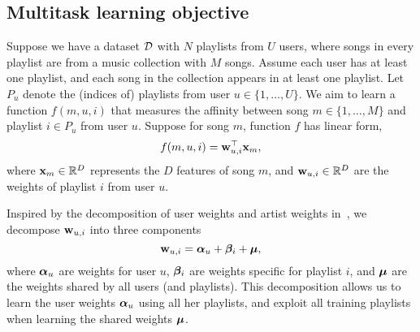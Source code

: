 \subsection{Multitask learning objective}

Suppose we have
a dataset $\mathcal{D}$ with $N$ playlists from $U$ users, 
where songs in every playlist are from a music collection with $M$ songs.
Assume each user has at least one playlist, and each song in the collection 
appears in at least one playlist.
%
Let $P_u$ denote the (indices of) playlists from user $u \in \{1,\dots,U\}$.
We aim to learn a function $f(m, u, i)$ that measures the affinity between 
song $m \in \{1,\dots,M\}$ and playlist $i \in P_u$ from user $u$.
Suppose for song $m$, function $f$ has linear form,
\begin{equation}
\label{eq:scorefunc}
f(m, u, i) = \mathbf{w}_{u,i}^\top \mathbf{x}_m,
\end{equation}
where %
$\mathbf{x}_m \in \mathbb{R}^D$ represents the $D$ features of song $m$,
and $\mathbf{w}_{u,i} \in \mathbb{R}^D$ are the weights %
of playlist $i$ from user $u$.



Inspired by the decomposition of user weights and artist weights in~\cite{ben2017groove},
we decompose $\mathbf{w}_{u,i}$ %
into three components
\begin{equation}
\label{eq:decomp}
\mathbf{w}_{u, i} = {\bm{\alpha}}_u + {\bm{\beta}}_i + \bm{\mu},
\end{equation}
where ${\bm{\alpha}}_u$ are weights for user $u$,
${\bm{\beta}}_i$ are weights specific for playlist $i$, %
and $\bm{\mu}$ are the weights shared by all users (and playlists).
This decomposition allows us to learn the user weights ${\bm{\alpha}}_u$ using all her
playlists, and exploit all training playlists when learning the shared weights $\bm{\mu}$.

